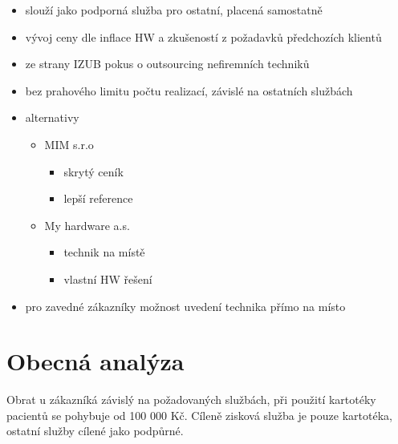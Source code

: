 \documentclass[11pt, a4paper, titlepage]{article}
\begin{document}
	\begin{itemize}
		\item slouží jako podporná služba pro ostatní, placená samostatně
		\item vývoj ceny dle inflace HW a zkušeností z požadavků předchozích klientů
		\item ze strany IZUB pokus o outsourcing nefiremních techniků
		\item bez prahového limitu počtu realizací, závislé na ostatních službách
		\item alternativy
		\begin{itemize}
			\item MIM s.r.o
			\begin{itemize}
				\item skrytý ceník
				\item lepší reference
			\end{itemize}
			\item My hardware a.s.
			\begin{itemize}
				\item technik na místě
				\item vlastní HW řešení
			\end{itemize}
		\end{itemize}
		\item pro zavedné zákazníky možnost uvedení technika přímo na místo
	\end{itemize}

	\section*{Obecná analýza}
	Obrat u zákazníká závislý na požadovaných službách, při použití kartotéky pacientů se pohybuje od 100 000 Kč. 
	Cíleně zisková služba je pouze kartotéka, ostatní služby cílené jako podpůrné.
\end{document}
